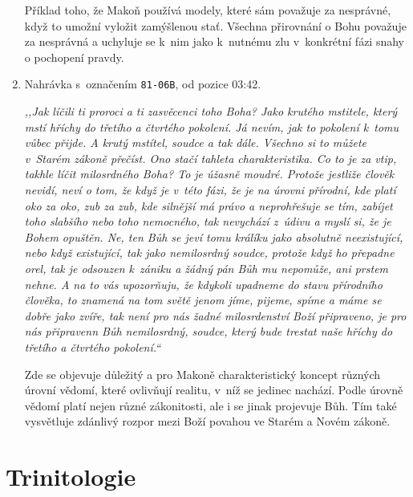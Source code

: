 \begin{enumerate}
{Příklad toho, že Makoň používá modely, které sám považuje za nesprávné, když to
umožní vyložit zamýšlenou stať. Všechna přirovnání o Bohu považuje za nesprávná
a uchyluje se k~nim jako k~nutnému zlu v~konkrétní fázi snahy o pochopení
pravdy.

}

\item{%
Nahrávka s~označením \texttt{81-06B}, od pozice 03:42.

\textit{%
,,Jak líčili ti proroci a ti zasvěcenci toho Boha? Jako krutého mstitele, který
mstí hříchy do třetího a čtvrtého pokolení. Já nevím, jak to pokolení k~tomu
vůbec přijde. A krutý mstítel,
soudce a tak dále. Všechno si to můžete v~Starém zákoně přečíst. Ono stačí tahleta
charakteristika. Co to je za vtip, takhle líčit milosrdného Boha? To je úžasně
moudré.
Protože jestliže člověk nevidí, neví o tom, že když je v~této fázi, že je na úrovni
přírodní, kde platí oko za oko, zub za zub, kde silnější má právo a neprohřešuje
se tím, zabíjet toho slabšího nebo toho nemocného, tak nevychází z~údivu a
myslí si,
že je Bohem opuštěn. Ne, ten Bůh se jeví tomu králíku jako absolutně
neexistující,
nebo když existující, tak jako nemilosrdný soudce, protože když ho přepadne orel,
tak je odsouzen k~zániku a žádný pán Bůh mu nepomůže, ani prstem nehne. A na to
vás upozorňuju, že kdykoli upadneme do stavu přírodního člověka, to znamená na
tom světě jenom jíme, pijeme, spíme a máme se dobře jako zvíře, tak není pro nás
žadné milosrdenství Boží připraveno, je pro nás připravenn Bůh nemilosrdný,
soudce, který bude trestat naše hříchy do třetího a čtvrtého pokolení.``
}

Zde se objevuje důležitý a pro Makoně charakteristický koncept různých úrovní
vědomí, které ovlivňují realitu, v~níž se jedinec nachází. Podle úrovně vědomí
platí nejen různé zákonitosti, ale i se jinak projevuje Bůh. Tím také vysvětluje
zdánlivý rozpor mezi Boží povahou ve Starém a Novém zákoně.

}

\end{enumerate}

\section{Trinitologie}


